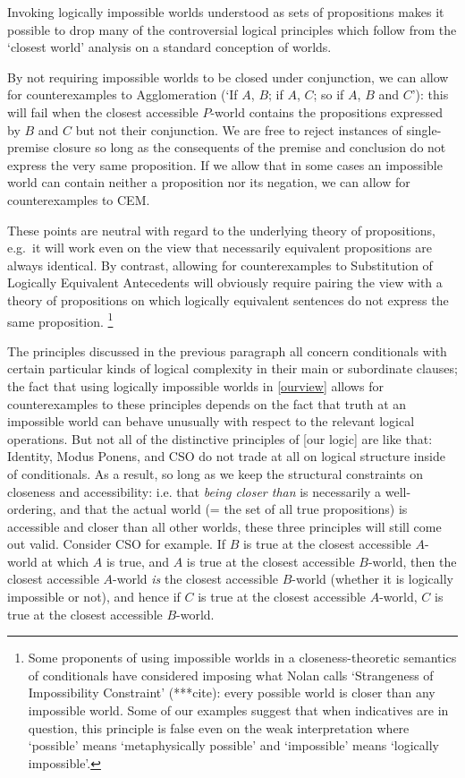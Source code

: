 \documentclass[If.tex]{subfiles}
\begin{document}
Invoking logically impossible worlds understood as sets of propositions makes it possible to drop many of the controversial logical principles which follow from the ‘closest world’ analysis on a standard conception of worlds.  
\begin{prop}
	\ritem
	By not requiring impossible worlds to be closed under conjunction, we can allow for counterexamples to Agglomeration (‘If $A$, $B$; if $A$, $C$; so if $A$, $B$ and $C$’): this will fail when the closest accessible $P$-world contains the propositions expressed by $B$ and $C$ but not their conjunction.
	\ritem
	We are free to reject instances of single-premise closure so long as the consequents of the premise and conclusion do not express the very same proposition.  
	\ritem
	If we allow that in some cases an impossible world can contain neither a proposition nor its negation, we can allow for counterexamples to CEM.  
\end{prop}
These points are neutral with regard to the underlying theory of propositions, e.g.\ it will work even on the view that necessarily equivalent propositions are always identical.  By contrast, allowing for counterexamples to Substitution of Logically Equivalent Antecedents will obviously require pairing the view with a theory of propositions on which logically equivalent sentences do not express the same proposition.%
\footnote{Some proponents of using impossible worlds in a closeness-theoretic semantics of conditionals have considered imposing what Nolan calls ‘Strangeness of Impossibility Constraint’ (***cite): every possible world is closer than any impossible world.  Some of our examples suggest that when indicatives are in question, this principle is false even on the weak interpretation where ‘possible’ means ‘metaphysically possible’ and ‘impossible’ means ‘logically impossible’.}

The principles discussed in the previous paragraph all concern conditionals with certain particular kinds of logical complexity in their main or subordinate clauses; the fact that using logically impossible worlds in \ref{ourview} allows for counterexamples to these principles depends on the fact that truth at an impossible world can behave unusually with respect to the relevant logical operations.  But not all of the distinctive principles of [our logic] are like that: Identity, Modus Ponens, and CSO do not trade at all on logical structure inside of conditionals.  As a result, so long as we keep the structural constraints on closeness and accessibility: i.e. that \emph{being closer than} is necessarily a well-ordering, and that the actual world (= the set of all true propositions) is accessible and closer than all other worlds, these three principles will still come out valid.   Consider CSO for example.  If $B$ is true at the closest accessible $A$-world at which $A$ is true, and $A$ is true at the closest accessible $B$-world, then the closest accessible $A$-world \emph{is} the closest accessible $B$-world (whether it is logically impossible or not), and hence if $C$ is true at the closest accessible $A$-world, $C$ is true at the closest accessible $B$-world.
\end{document}
